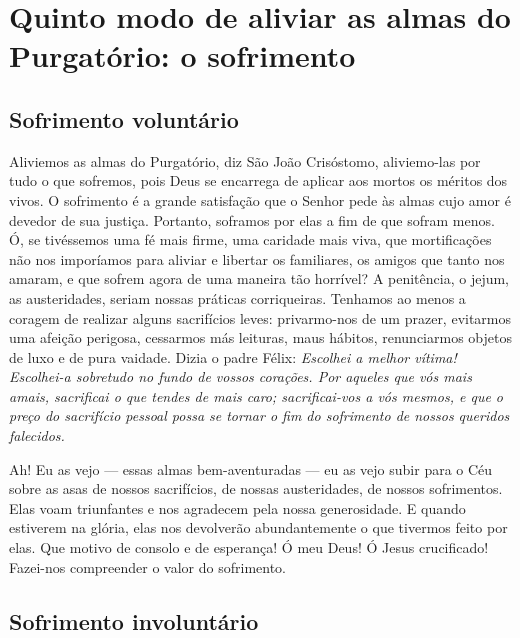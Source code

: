 \renewcommand{\thechapterdisplay}{Vigésimo quarto dia}
\renewcommand{\thechapterrunner}{Quinto modo de aliviar as almas do Purgatório: o sofrimento}
\chapter[Vigésimo quarto dia --- Quinto modo de aliviar as almas do Purgatório: o sofrimento]{Quinto modo de aliviar as almas do Purgatório: o sofrimento}
\section*{Sofrimento voluntário}

Aliviemos as almas do Purgatório, diz São João Crisóstomo, aliviemo-las por tudo o que sofremos, pois Deus se encarrega de aplicar aos mortos os méritos dos vivos. O sofrimento é a grande satisfação que o Senhor pede às almas cujo amor é devedor de sua justiça. Portanto, soframos por elas a fim de que sofram menos. Ó, se tivéssemos uma fé mais firme, uma caridade mais viva, que mortificações não nos imporíamos para aliviar e libertar os familiares, os amigos que tanto nos amaram, e que sofrem agora de uma maneira tão horrível? A penitência, o jejum, as austeridades, seriam nossas práticas corriqueiras. Tenhamos ao menos a coragem de realizar alguns sacrifícios leves: privarmo-nos de um prazer, evitarmos uma afeição perigosa, cessarmos más leituras, maus hábitos, renunciarmos objetos de luxo e de pura vaidade. Dizia o padre Félix: \textit{Escolhei a melhor vítima! Escolhei-a sobretudo no fundo de vossos corações. Por aqueles que vós mais amais, sacrificai o que tendes de mais caro; sacrificai-vos a vós mesmos, e que o preço do sacrifício pessoal possa se tornar o fim do sofrimento de nossos queridos falecidos.}

Ah! Eu as vejo --- essas almas bem-aventuradas --- eu as vejo subir para o Céu sobre as asas de nossos sacrifícios, de nossas austeridades, de nossos sofrimentos. Elas voam triunfantes e nos agradecem pela nossa generosidade. E quando estiverem na glória, elas nos devolverão abundantemente o que tivermos feito por elas. Que motivo de consolo e de esperança! Ó meu Deus! Ó Jesus crucificado! Fazei-nos compreender o valor do sofrimento.


\section*{Sofrimento involuntário}

